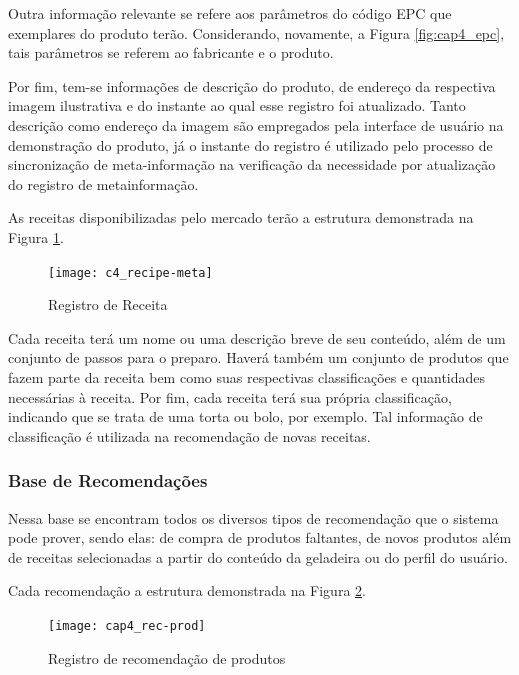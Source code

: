 Outra informação relevante se refere aos parâmetros do código EPC que exemplares do produto terão. Considerando, novamente, a Figura \ref{fig:cap4_epc}, tais parâmetros se referem ao fabricante e o produto.

Por fim, tem-se informações de descrição do produto, de endereço da respectiva imagem ilustrativa e do instante ao qual esse registro foi atualizado. Tanto descrição como endereço da imagem são empregados pela interface de usuário na demonstração do produto, já o instante do registro é utilizado pelo processo de sincronização de meta-informação na verificação da necessidade por atualização do registro de metainformação.

As receitas disponibilizadas pelo mercado terão a estrutura demonstrada na Figura \ref{fig:c4_recipe-meta}.

\begin{figure}[htb]
    \caption{Registro de Receita}
    \label{fig:c4_recipe-meta}
    \texttt{[image: c4\_recipe-meta]}
\end{figure}

Cada receita terá um nome ou uma descrição breve de seu conteúdo, além de um conjunto de passos para o preparo. Haverá também um conjunto de produtos que fazem parte da receita bem como suas respectivas classificações e quantidades necessárias à receita. Por fim, cada receita terá sua própria classificação, indicando que se trata de uma torta ou bolo, por exemplo. Tal informação de classificação é utilizada na recomendação de novas receitas.

\subsubsection{Base de Recomendações}


Nessa base se encontram todos os diversos tipos de recomendação que o sistema pode prover, sendo elas: de compra de produtos faltantes, de novos produtos além de receitas selecionadas a partir do conteúdo da geladeira ou do perfil do usuário.

Cada recomendação a estrutura demonstrada na Figura \ref{fig:cap4_rec-prod}.

\begin{figure}[htb]
    \caption{Registro de recomendação de produtos}
    \label{fig:cap4_rec-prod}
    \texttt{[image: cap4\_rec-prod]}
\end{figure}


